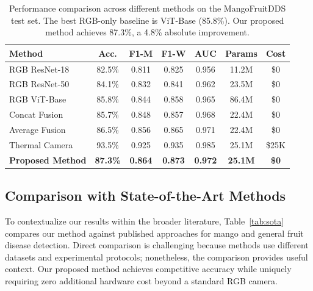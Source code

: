 \documentclass[utf8]{FrontiersinHarvard}
\newenvironment{revblock}{}{}
\begin{document}
\begin{table}[h!]
    \caption{Performance comparison across different methods on the MangoFruitDDS test set. The best RGB-only baseline is ViT-Base (85.8\%). Our proposed method achieves 87.3\%, a 4.8\% absolute improvement.}
    \label{tab:performance}
    \raggedright
    \scriptsize
    \begin{tabular}{lcccccc}
        \toprule
        \textbf{Method} & \textbf{Acc.} & \textbf{F1-M} & \textbf{F1-W} & \textbf{AUC} & \textbf{Params} & \textbf{Cost} \\
        \midrule
        RGB ResNet-18 & 82.5\% & 0.811 & 0.825 & 0.956 & 11.2M & \$0 \\
        RGB ResNet-50 & 84.1\% & 0.832 & 0.841 & 0.962 & 23.5M & \$0 \\
        RGB ViT-Base & 85.8\% & 0.844 & 0.858 & 0.965 & 86.4M & \$0 \\
        Concat Fusion & 85.7\% & 0.848 & 0.857 & 0.968 & 22.4M & \$0 \\
        Average Fusion & 86.5\% & 0.856 & 0.865 & 0.971 & 22.4M & \$0 \\
        Thermal Camera & 93.5\% & 0.925 & 0.935 & 0.985 & 25.1M & \$25K \\
        \rowcolor{green!20}
        \textbf{Proposed Method} & \textbf{87.3\%} & \textbf{0.864} & \textbf{0.873} & \textbf{0.972} & \textbf{25.1M} & \textbf{\$0} \\
        \bottomrule
    \end{tabular}
\end{table}

\begin{revblock}
\subsection{Comparison with State-of-the-Art Methods}
To contextualize our results within the broader literature, Table~\ref{tab:sota} compares our method against published approaches for mango and general fruit disease detection. Direct comparison is challenging because methods use different datasets and experimental protocols; nonetheless, the comparison provides useful context. Our proposed method achieves competitive accuracy while uniquely requiring zero additional hardware cost beyond a standard RGB camera.
\end{revblock}
\end{document}
